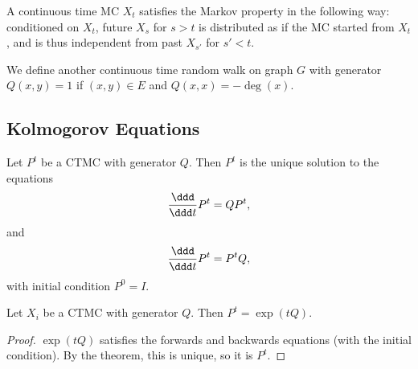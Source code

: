 \begin{theorem}
\proplabel

A continuous time MC $X_t$ satisfies the Markov property in the following way: conditioned on $X_t$, future $X_s$ for $s > t$ is distributed as if the MC started from $X_t$, and is thus independent from past $X_{s'}$ for $s' < t$. 
\end{theorem}

\begin{example}
\exlabel

We define another continuous time random walk on graph $G$ with generator $Q(x,y) = 1$ if $(x,y)\in E$ and $Q(x,x) = -\deg(x)$. 
\end{example}

\subsection{Kolmogorov Equations}

\begin{theorem}

Let $P^t$ be a CTMC with generator $Q$. Then $P^t$ is the unique solution to the equations 
\[\frac{\ddd}{\ddd t}P^t = QP^t,\]
and 
\[\frac{\ddd}{\ddd t}P^t = P^tQ,\]
with initial condition $P^0 = I$.
\end{theorem}

\begin{theorem}
\corlabel

Let $X_i$ be a CTMC with generator $Q$. Then $P^t = \exp(tQ)$. 
\end{theorem}

\begin{proof}
$\exp(tQ)$ satisfies the forwards and backwards equations (with the initial condition). By the theorem, this is unique, so it is $P^t$. 
\end{proof}

